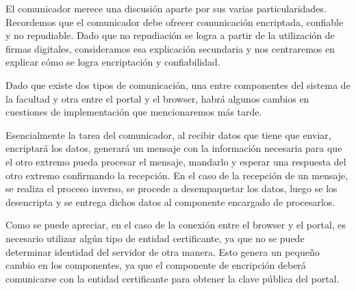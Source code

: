 El comunicador merece una discusión aparte por sus varias particularidades. Recordemos que el comunicador debe ofrecer comunicación encriptada, confiable y no repudiable. Dado que no repudiación se logra a partir de la utilización de firmas digitales, consideramos esa explicación secundaria y nos centraremos en explicar cómo se logra encriptación y confiabilidad.

Dado que existe dos tipos de comunicación, una entre componentes del sistema de la facultad y otra entre el portal y el browser, habrá algunos cambios en cuestiones de implementación que mencionaremos más tarde.

Esencialmente la tarea del comunicador, al recibir datos que tiene que enviar, encriptará los datos, generará un mensaje con la información necesaria para que el otro extremo pueda procesar el mensaje, mandarlo y esperar una respuesta del otro extremo confirmando la recepción.
En el caso de la recepción de un mensaje, se realiza el proceso inverso, se procede a desempaquetar los datos, luego se los desencripta y se entrega dichos datos al componente encargado de procesarlos.

Como se puede apreciar, en el caso de la conexión entre el browser y el portal, es necesario utilizar algún tipo de entidad certificante, ya que no se puede determinar identidad del servidor de otra manera. Esto genera un pequeño cambio en los componentes, ya que el componente de encripción deberá comunicarse con la entidad certificante para obtener la clave pública del portal.
